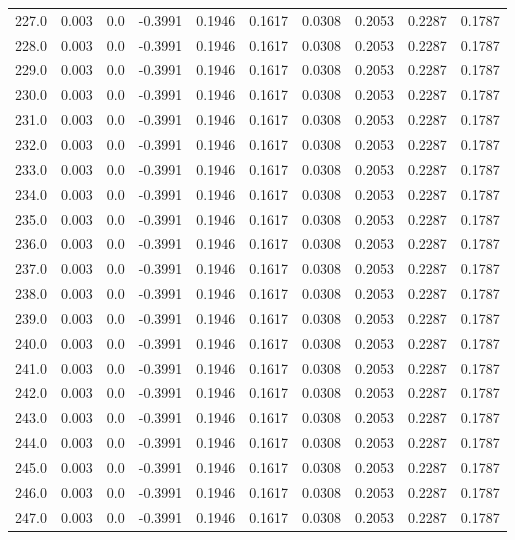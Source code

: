 \begin{longtable}{lrrrrrrrrr}
227.0 & 0.003 & 0.0 & -0.3991 & 0.1946 & 0.1617 & 0.0308 & 0.2053 & 0.2287 & 0.1787 \\
228.0 & 0.003 & 0.0 & -0.3991 & 0.1946 & 0.1617 & 0.0308 & 0.2053 & 0.2287 & 0.1787 \\
229.0 & 0.003 & 0.0 & -0.3991 & 0.1946 & 0.1617 & 0.0308 & 0.2053 & 0.2287 & 0.1787 \\
230.0 & 0.003 & 0.0 & -0.3991 & 0.1946 & 0.1617 & 0.0308 & 0.2053 & 0.2287 & 0.1787 \\
231.0 & 0.003 & 0.0 & -0.3991 & 0.1946 & 0.1617 & 0.0308 & 0.2053 & 0.2287 & 0.1787 \\
232.0 & 0.003 & 0.0 & -0.3991 & 0.1946 & 0.1617 & 0.0308 & 0.2053 & 0.2287 & 0.1787 \\
233.0 & 0.003 & 0.0 & -0.3991 & 0.1946 & 0.1617 & 0.0308 & 0.2053 & 0.2287 & 0.1787 \\
234.0 & 0.003 & 0.0 & -0.3991 & 0.1946 & 0.1617 & 0.0308 & 0.2053 & 0.2287 & 0.1787 \\
235.0 & 0.003 & 0.0 & -0.3991 & 0.1946 & 0.1617 & 0.0308 & 0.2053 & 0.2287 & 0.1787 \\
236.0 & 0.003 & 0.0 & -0.3991 & 0.1946 & 0.1617 & 0.0308 & 0.2053 & 0.2287 & 0.1787 \\
237.0 & 0.003 & 0.0 & -0.3991 & 0.1946 & 0.1617 & 0.0308 & 0.2053 & 0.2287 & 0.1787 \\
238.0 & 0.003 & 0.0 & -0.3991 & 0.1946 & 0.1617 & 0.0308 & 0.2053 & 0.2287 & 0.1787 \\
239.0 & 0.003 & 0.0 & -0.3991 & 0.1946 & 0.1617 & 0.0308 & 0.2053 & 0.2287 & 0.1787 \\
240.0 & 0.003 & 0.0 & -0.3991 & 0.1946 & 0.1617 & 0.0308 & 0.2053 & 0.2287 & 0.1787 \\
241.0 & 0.003 & 0.0 & -0.3991 & 0.1946 & 0.1617 & 0.0308 & 0.2053 & 0.2287 & 0.1787 \\
242.0 & 0.003 & 0.0 & -0.3991 & 0.1946 & 0.1617 & 0.0308 & 0.2053 & 0.2287 & 0.1787 \\
243.0 & 0.003 & 0.0 & -0.3991 & 0.1946 & 0.1617 & 0.0308 & 0.2053 & 0.2287 & 0.1787 \\
244.0 & 0.003 & 0.0 & -0.3991 & 0.1946 & 0.1617 & 0.0308 & 0.2053 & 0.2287 & 0.1787 \\
245.0 & 0.003 & 0.0 & -0.3991 & 0.1946 & 0.1617 & 0.0308 & 0.2053 & 0.2287 & 0.1787 \\
246.0 & 0.003 & 0.0 & -0.3991 & 0.1946 & 0.1617 & 0.0308 & 0.2053 & 0.2287 & 0.1787 \\
247.0 & 0.003 & 0.0 & -0.3991 & 0.1946 & 0.1617 & 0.0308 & 0.2053 & 0.2287 & 0.1787 \\

\end{longtable}
